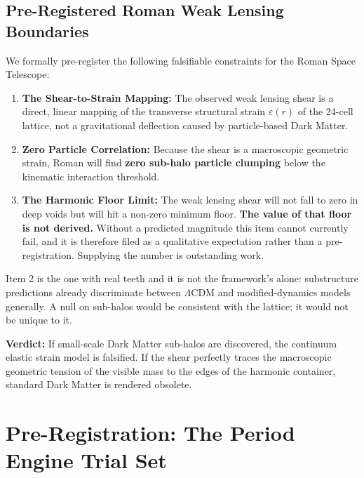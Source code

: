 \documentclass[11pt, letterpaper, openany]{book}
\begin{document}
\section{Pre-Registered Roman Weak Lensing Boundaries}
\label{sec:roman}

We formally pre-register the following falsifiable constraints for the Roman Space Telescope:

\begin{enumerate}
    \item \textbf{The Shear-to-Strain Mapping:} The observed weak lensing shear is a direct, linear mapping of the transverse structural strain $\varepsilon(r)$ of the 24-cell lattice, not a gravitational deflection caused by particle-based Dark Matter. 
    \item \textbf{Zero Particle Correlation:} Because the shear is a macroscopic geometric strain, Roman will find \textbf{zero sub-halo particle clumping} below the kinematic interaction threshold. 
    \item \textbf{The Harmonic Floor Limit:} The weak lensing shear will not fall to zero in deep
    voids but will hit a non-zero minimum floor. \textbf{The value of that floor is not derived.}
    Without a predicted magnitude this item cannot currently fail, and it is therefore filed as a
    qualitative expectation rather than a pre-registration. Supplying the number is outstanding work.
\end{enumerate}

\begin{warningbox}
Item 2 is the one with real teeth and it is not the framework's alone: substructure predictions
already discriminate between $\Lambda$CDM and modified-dynamics models generally. A null on
sub-halos would be consistent with the lattice; it would not be unique to it.
\end{warningbox}

\textbf{Verdict:} If small-scale Dark Matter sub-halos are discovered, the continuum elastic strain model is falsified. If the shear perfectly traces the macroscopic geometric tension of the visible mass to the edges of the harmonic container, standard Dark Matter is rendered obsolete.

\chapter{Pre-Registration: The Period Engine Trial Set}
\end{document}
